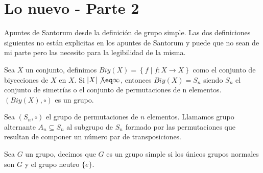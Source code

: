 
\chapter{Lo nuevo - Parte 2}

Apuntes de Santorum desde la definición de grupo simple.
Las dos definiciones siguientes no están explicitas en los apuntes de Santorum y puede que no sean de mi parte pero las necesito para la legibilidad de la misma.
\begin{dfn}
	\label{dfn:grupobiy}
	Sea $X$ un conjunto, definimos $Biy(X)=\left\{f\mid f : X \longrightarrow X  \right\}$ como el conjunto de biyecciones de $X$ en $X$. Si $|X| \not \eq \infty$, entonces $Biy(X) = S_n$ siendo $S_n$ el conjunto de simetrías o el conjunto de permutaciones de n elementos. $(Biy(X), \circ)$ es un grupo.
\end{dfn}

\begin{dfn}
	\label{dfn:grupopermpar}
	Sea $(S_n,\circ)$ el grupo de permutaciones de $n$ elementos. Llamamos grupo alternante $A_n \subseteq S_n$ al subgrupo de $S_n$ formado por las permutaciones que resultan de componer un número par de transposiciones.
\end{dfn}

\begin{dfn}
	Sea $G$ un grupo, decimos que $G$ es un grupo simple si los únicos grupos normales son $G$ y el grupo neutro $\{e\}.$
\end{dfn}

